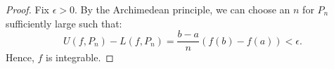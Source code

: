 \documentclass[12pt]{amsart}
\begin{document}
\begin{enumerate}
\begin{proof}
Fix $\epsilon > 0$. By the Archimedean principle, we can choose an $n$ for $P_n$ sufficiently large such that:
\[ U(f, P_n) - L(f, P_n) = \frac{b-a}{n} \left( f(b) - f(a) \right) < \epsilon. \]
Hence, $f$ is integrable.
\end{proof}

%
%
%
%
%

\end{enumerate}
\end{document}

